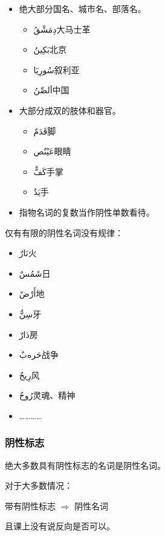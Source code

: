\begin{itemize}
    \item 绝大部分国名、城市名、部落名。
    \begin{itemize}
        \item \ac{دِمَشْقُ}{大马士革}
        \item \ac{بَكِينُ}{北京}
        \item \ac{سُورِيَا}{叙利亚}
        \item \ac{اَلصِّنُ}{中国}
    \end{itemize}
    \item 大部分成双的肢体和器官。
    \begin{itemize}
        \item \ac{قَدَمٌ}{脚}
        \item \ac{عَيْنٌص}{眼睛}
        \item \ac{كَفٌّ}{手掌}
        \item \ac{يَدٌ}{手}
    \end{itemize}
    \item 指物名词的复数当作阴性单数看待。
\end{itemize}

仅有有限的阴性名词没有规律：

\begin{itemize}
    \item \ac{نَارٌ}{火}
    \item \ac{شَمُسٌ}{日}
    \item \ac{أَرْضٌ}{地}
    \item \ac{سِنٌّ}{牙}
    \item \ac{دَارٌ}{房}
    \item \ac{حَرەبٌ}{战争}
    \item \ac{رِيحٌ}{风}
    \item \ac{رُوحٌ}{灵魂、精神}
    \item …………
\end{itemize}

\subsubsection{阴性标志}

绝大多数具有阴性标志的名词是阴性名词。

\begin{note}
    对于大多数情况：
    
    \begin{center}
        带有阴性标志 $\Rightarrow $ 阴性名词
    \end{center}

    且课上没有说反向是否可以。
\end{note}


